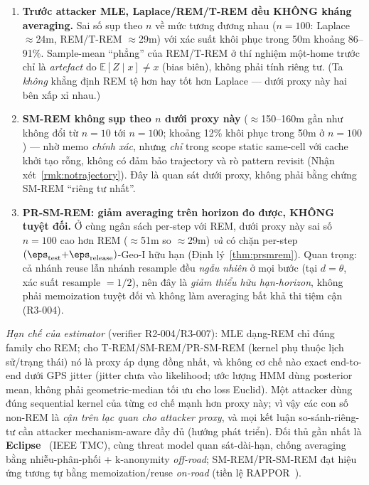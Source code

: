 \begin{enumerate}
  \item \textbf{Trước attacker MLE, Laplace/REM/T-REM đều KHÔNG kháng averaging.}
  Sai số sụp theo $n$ về mức tương đương nhau ($n{=}100$: Laplace $\approx$24m,
  REM/T-REM $\approx$29m) với xác suất khôi phục trong 50m khoảng 86--91\%.
  Sample-mean ``phẳng'' của REM/T-REM ở thí nghiệm một-home trước chỉ là
  \emph{artefact} do $\mathbb{E}[Z\mid x]\ne x$ (bias biên), không phải tính
  riêng tư. (Ta \emph{không} khẳng định REM tệ hơn hay tốt hơn Laplace --- dưới
  proxy này hai bên xấp xỉ nhau.)
  \item \textbf{SM-REM không sụp theo $n$ dưới proxy này} ($\approx$150--160m gần
  như không đổi từ $n{=}10$ tới $n{=}100$; khoảng 12\% khôi phục trong 50m ở
  $n{=}100$) --- nhờ memo \emph{chính xác}, nhưng \emph{chỉ} trong scope static
  same-cell với cache khởi tạo rỗng, không có đảm bảo trajectory và rò pattern
  revisit (Nhận xét~\ref{rmk:notrajectory}). Đây là quan sát dưới proxy, không
  phải bằng chứng SM-REM ``riêng tư nhất''.
  \item \textbf{PR-SM-REM: giảm averaging trên horizon đo được, KHÔNG tuyệt đối.}
  Ở cùng ngân sách per-step với REM, dưới proxy này sai số $n{=}100$ cao hơn
  REM ($\approx$51m so $\approx$29m) \emph{và} có chặn per-step
  $(\eps_{\text{test}}{+}\eps_{\text{release}})$-Geo-I hữu hạn (Định
  lý~\ref{thm:prsmrem}). Quan trọng: cả nhánh reuse lẫn nhánh resample đều
  \emph{ngẫu nhiên} ở mọi bước (tại $d{=}\theta$, xác suất resample $=1/2$), nên
  đây là \emph{giảm thiểu hữu hạn-horizon}, không phải memoization tuyệt đối và
  không làm averaging bất khả thi tiệm cận (R3-004).
\end{enumerate}

\noindent \emph{Hạn chế của estimator} (verifier R2-004/R3-007):
\label{sec:attacker-proxy-caveat}
MLE dạng-REM chỉ đúng family cho REM; cho T-REM/SM-REM/PR-SM-REM (kernel phụ
thuộc lịch sử/trạng thái) nó là proxy áp dụng đồng nhất, và không cơ chế nào
exact end-to-end dưới GPS jitter (jitter chưa vào likelihood; ước lượng HMM dùng
posterior mean, không phải geometric-median tối ưu cho loss Euclid). Một attacker
dùng đúng sequential kernel của từng cơ chế mạnh hơn proxy này; vì vậy các con số
non-REM là \emph{cận trên lạc quan cho attacker proxy}, và mọi kết luận
so-sánh-riêng-tư cần attacker mechanism-aware đầy đủ (hướng phát triển). Đối thủ
gần nhất là
\textbf{Eclipse}~\cite{niu2020eclipse} (IEEE TMC), cùng threat model quan
sát-dài-hạn, chống averaging bằng nhiễu-phân-phối + k-anonymity \emph{off-road};
SM-REM/PR-SM-REM đạt hiệu ứng tương tự bằng memoization/reuse \emph{on-road}
(tiền lệ RAPPOR~\cite{erlingsson2014rappor}).

